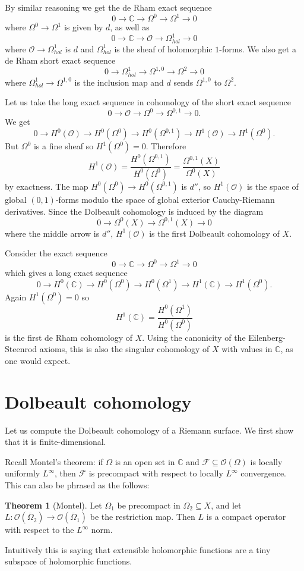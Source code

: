 \documentclass[12pt]{book}
\newcommand{\CC}{\mathbb{C}}
\newcommand{\Olo}{\mathscr O}
\theoremstyle{definition}
\newtheorem{theorem}{Theorem}[chapter]
\newenvironment{example}
  {\pushQED{\qed}\renewcommand{\qedsymbol}{$\diamondsuit$}\examplex}
  {\popQED\endexamplex}
\begin{document}
By similar reasoning we get the de Rham exact sequence
$$0 \to \CC \to \Omega^0 \to \Omega^1 \to 0$$
where $\Omega^0 \to \Omega^1$ is given by $d$, as well as
$$0 \to \CC \to \Olo \to \Omega_{hol}^1 \to 0$$
where $\Olo \to \Omega_{hol}^1$ is $d$ and $\Omega_{hol}^1$ is the sheaf of holomorphic $1$-forms.
We also get a de Rham short exact sequence
$$0 \to \Omega_{hol}^1 \to \Omega^{1,0} \to \Omega^2 \to 0$$
where $\Omega_{hol}^1 \to \Omega^{1,0}$ is the inclusion map and $d$ sends $\Omega^{1,0}$ to $\Omega^2$.

\begin{example}
Let us take the long exact sequence in cohomology of the short exact sequence
$$0 \to \Olo \to \Omega^0 \to \Omega^{0,1} \to 0.$$
We get
$$0 \to H^0(\Olo) \to H^0(\Omega^0) \to H^0(\Omega^{0,1}) \to H^1(\Olo) \to H^1(\Omega^0).$$
But $\Omega^0$ is a fine sheaf so $H^1(\Omega^0) = 0$. Therefore
$$H^1(\Olo) = \frac{H^0(\Omega^{0,1})}{H^0(\Omega^0)} = \frac{\Omega^{0,1}(X)}{\Omega^0(X)}$$
by exactness.
The map $H^0(\Omega^0) \to H^0(\Omega^{0,1})$ is $d''$, so $H^1(\Olo)$ is the space of global $(0,1)$-forms modulo the space of global exterior Cauchy-Riemann derivatives.
Since the Dolbeault cohomology is induced by the diagram
$$0 \to \Omega^0(X) \to \Omega^{0,1}(X) \to 0$$
where the middle arrow is $d''$, $H^1(\Olo)$ is the first Dolbeault cohomology of $X$.
\end{example}

\begin{example}
Consider the exact sequence
$$0 \to \CC \to \Omega^0 \to \Omega^1 \to 0$$
which gives a long exact sequence
$$0 \to H^0(\CC) \to H^0(\Omega^0) \to H^0(\Omega^1) \to H^1(\CC) \to H^1(\Omega^0).$$
Again $H^1(\Omega^0) = 0$ so
$$H^1(\CC) = \frac{H^0(\Omega^1)}{H^0(\Omega^0)}$$
is the first de Rham cohomology of $X$.
Using the canonicity of the Eilenberg-Steenrod axioms, this is also the singular cohomology of $X$ with values in $\CC$, as one would expect.
\end{example}

\section{Dolbeault cohomology}
Let us compute the Dolbeault cohomology of a Riemann surface.
We first show that it is finite-dimensional.

Recall Montel's theorem: if $\Omega$ is an open set in $\CC$ and $\mathcal F \subseteq \Olo(\Omega)$ is locally uniformly $L^\infty$, then $\mathcal F$ is precompact with respect to locally $L^\infty$ convergence.
This can also be phrased as the follows:
\begin{theorem}[Montel]
Let $\Omega_1$ be precompact in $\Omega_2 \subseteq X$, and let $L: \Olo(\overline \Omega_2) \to \Olo(\overline \Omega_1)$ be the restriction map.
Then $L$ is a compact operator with respect to the $L^\infty$ norm.
\end{theorem}
Intuitively this is saying that extensible holomorphic functions are a tiny subspace of holomorphic functions.
\end{document}
